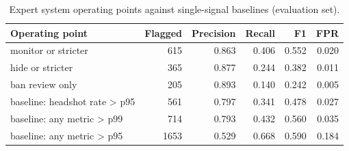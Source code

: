 \begin{table}
\caption{Expert system operating points against single-signal baselines (evaluation set).}
\label{tab:operating-points}
\begin{tabular}{lrrrrr}
\toprule
Operating point & Flagged & Precision & Recall & F1 & FPR \\
\midrule
monitor or stricter & 615 & 0.863 & 0.406 & 0.552 & 0.020 \\
hide or stricter & 365 & 0.877 & 0.244 & 0.382 & 0.011 \\
ban review only & 205 & 0.893 & 0.140 & 0.242 & 0.005 \\
baseline: headshot rate > p95 & 561 & 0.797 & 0.341 & 0.478 & 0.027 \\
baseline: any metric > p99 & 714 & 0.793 & 0.432 & 0.560 & 0.035 \\
baseline: any metric > p95 & 1653 & 0.529 & 0.668 & 0.590 & 0.184 \\
\bottomrule
\end{tabular}
\end{table}
